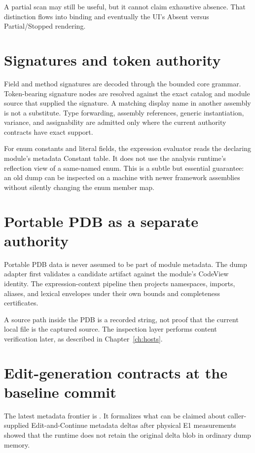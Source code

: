 \documentclass[11pt,oneside,openany]{book}
\newcommand{\repoPath}[1]{\path{#1}}
\newcommand{\status}[1]{\textsf{#1}}
\begin{document}
A partial scan may still be useful, but it cannot claim exhaustive absence. That distinction flows into binding and eventually the UI's \status{Absent} versus \status{Partial}/\status{Stopped} rendering.

\section{Signatures and token authority}

Field and method signatures are decoded through the bounded core grammar. Token-bearing signature nodes are resolved against the exact catalog and module source that supplied the signature. A matching display name in another assembly is not a substitute. Type forwarding, assembly references, generic instantiation, variance, and assignability are admitted only where the current authority contracts have exact support.

For enum constants and literal fields, the expression evaluator reads the declaring module's metadata Constant table. It does not use the analysis runtime's reflection view of a same-named enum. This is a subtle but essential guarantee: an old dump can be inspected on a machine with newer framework assemblies without silently changing the enum member map.

\section{Portable PDB as a separate authority}

Portable PDB data is never assumed to be part of module metadata. The dump adapter first validates a candidate artifact against the module's CodeView identity. The expression-context pipeline then projects namespaces, imports, aliases, and lexical envelopes under their own bounds and completeness certificates.

A source path inside the PDB is a recorded string, not proof that the current local file is the captured source. The inspection layer performs content verification later, as described in Chapter~\ref{ch:hosts}.

\section{Edit-generation contracts at the baseline commit}

The latest metadata frontier is \repoPath{MetadataEditGenerationContracts.cs}. It formalizes what can be claimed about caller-supplied Edit-and-Continue metadata deltas after physical E1 measurements showed that the runtime does not retain the original delta blob in ordinary dump memory.
\end{document}
